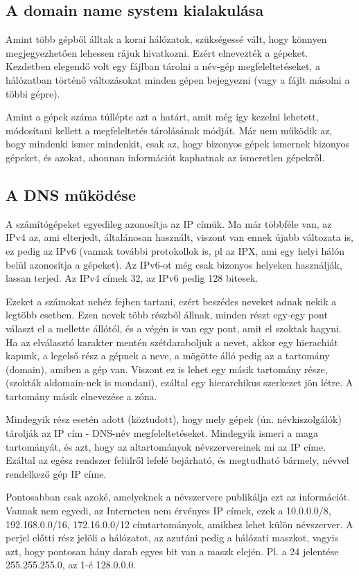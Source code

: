 \documentclass[fleqn,10pt,a4paper]{article}
\theoremstyle{magyar}
\begin{document}
  \subsection{A domain name system kialakulása}
  Amint több gépből álltak a korai hálózatok, szükségessé vált, hogy könnyen megjegyezhetően lehessen rájuk
  hivatkozni. Ezért elnevezték a gépeket. Kezdetben elegendő volt egy fájlban tárolni a név-gép megfeleltetéseket, a
  hálózatban történő változásokat minden gépen bejegyezni (vagy a fájlt másolni a többi gépre).
  
  Amint a gépek száma túllépte azt a határt, amit még így kezelni lehetett, módosítani kellett a megfeleltetés
  tárolásának módját. Már nem működik az, hogy mindenki ismer mindenkit, csak az, hogy bizonyos gépek ismernek
  bizonyos gépeket, és azokat, ahonnan információt kaphatnak az ismeretlen gépekről.

  \subsection{A DNS működése}
  A számítógépeket egyedileg azonosítja az IP címük. Ma már többféle van, az IPv4 az, ami elterjedt, általánosan
  használt, viszont van ennek újabb változata is, ez pedig az IPv6 (vannak további protokollok is, pl az IPX, ami egy
  helyi hálón belül azonosítja a gépeket). Az IPv6-ot még csak bizonyos helyeken használják, lassan terjed. Az IPv4
  címek 32, az IPv6 pedig 128 bitesek.
  
  Ezeket a számokat nehéz fejben tartani, ezért beszédes neveket adnak nekik a legtöbb esetben. Ezen nevek több részből
  állnak, minden részt egy-egy pont választ el a mellette állótól, és a végén is van egy pont, amit el szoktak
  hagyni. Ha az elválasztó karakter mentén szétdaraboljuk a nevet, akkor egy hierachiát kapunk, a legelső rész a gépnek
  a neve, a mögötte álló pedig az a tartomány (domain), amiben a gép van. Viszont ez is lehet egy másik tartomány része,
  (szokták aldomain-nek is mondani), ezáltal egy hierarchikus szerkezet jön létre. A tartomány másik elnevezése a zóna.

  Mindegyik rész esetén adott (köztudott), hogy mely gépek (ún. névkiszolgálók) tárolják az IP cím - DNS-név
  megfeleltetéseket. Mindegyik ismeri a maga tartományát, és azt, hogy az altartományok névszervereinek mi az IP
  címe. Ezáltal az egész rendszer felülről lefelé bejárható, és megtudható bármely, névvel rendelkező gép IP
  címe.
  
  Pontosabban csak azoké, amelyeknek a névszervere publikálja ezt az információt. Vannak nem egyedi, az Interneten nem
  érvényes IP címek, ezek a 10.0.0.0/8, 192.168.0.0/16, 172.16.0.0/12 címtartományok, amikhez lehet külön névszerver. A
  perjel előtti rész jelöli a hálózatot, az azutáni pedig a hálózati maszkot, vagyis azt, hogy pontosan hány darab egyes
  bit van a maszk elején. Pl. a 24 jelentése 255.255.255.0, az 1-é 128.0.0.0.
  
\end{document}
